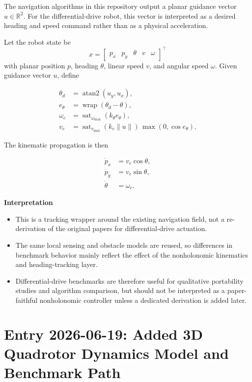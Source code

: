 \documentclass[11pt]{article}
\begin{document}
The navigation algorithms in this repository output a planar guidance vector
\(u \in \mathbb{R}^2\). For the differential-drive robot, this vector is
interpreted as a desired heading and speed command rather than as a physical
acceleration.

Let the robot state be
\[
x = \begin{bmatrix} p_x & p_y & \theta & v & \omega \end{bmatrix}^\top
\]
with planar position \(p\), heading \(\theta\), linear speed \(v\), and angular
speed \(\omega\). Given guidance vector \(u\), define

\begin{align}
\theta_d &= \operatorname{atan2}(u_y, u_x), \\
e_\theta &= \operatorname{wrap}(\theta_d - \theta), \\
\omega_c &= \operatorname{sat}_{\omega_{\max}}(k_\theta e_\theta), \\
v_c &= \operatorname{sat}_{v_{\max}}(k_v \lVert u \rVert)\,\max(0,\cos e_\theta).
\end{align}

The kinematic propagation is then

\begin{align}
\dot{p}_x &= v_c \cos \theta, \\
\dot{p}_y &= v_c \sin \theta, \\
\dot{\theta} &= \omega_c.
\end{align}

\textbf{Interpretation}

\begin{itemize}[leftmargin=*]
  \item This is a tracking wrapper around the existing navigation field, not a re-derivation of the original papers for differential-drive actuation.
  \item The same local sensing and obstacle models are reused, so differences in benchmark behavior mainly reflect the effect of the nonholonomic kinematics and heading-tracking layer.
  \item Differential-drive benchmarks are therefore useful for qualitative portability studies and algorithm comparison, but should not be interpreted as a paper-faithful nonholonomic controller unless a dedicated derivation is added later.
\end{itemize}

\section*{Entry 2026-06-19: Added 3D Quadrotor Dynamics Model and Benchmark Path}
\end{document}
